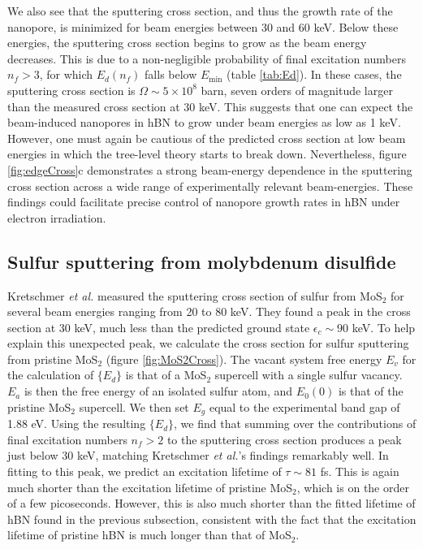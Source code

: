 \documentclass{article}
\begin{document}
We also see that the sputtering cross section, and thus the growth rate of the
nanopore, is minimized for beam energies between 30 and 60 keV.
Below these energies, the sputtering cross section begins to grow as the beam
energy decreases.
This is due to a non-negligible probability of final excitation numbers $n_f >
3$, for which $E_d(n_f)$ falls below $E_\text{min}$ (table \ref{tab:Ed}).
In these cases, the sputtering cross section is $\Omega \sim 5\times10^8$ barn,
seven orders of magnitude larger than the measured cross section at 30 keV.
This suggests that one can expect the beam-induced nanopores in hBN to grow under
beam energies as low as 1 keV.
However, one must again be cautious of the predicted cross section at low beam
energies in which the tree-level theory starts to break down.
Nevertheless, figure \ref{fig:edgeCross}c demonstrates a strong beam-energy
dependence in the sputtering cross section across a wide range of
experimentally relevant beam-energies.
These findings could facilitate precise control of nanopore growth rates in hBN
under electron irradiation.

\subsection{Sulfur sputtering from molybdenum disulfide}
\label{sec:MoS2}

Kretschmer \textit{et al.} measured the sputtering cross section of sulfur from MoS$_2$
for several beam energies ranging from 20 to 80 keV.\cite{Kretschmer2020}
They found a peak in the cross section at 30 keV, much less than the predicted
ground state $\epsilon_c\sim 90$ keV.\cite{Kretschmer2020}
To help explain this unexpected peak, we calculate the cross section for sulfur
sputtering from pristine MoS$_2$ (figure \ref{fig:MoS2Cross}).
The vacant system free energy $E_v$ for the calculation of $\{E_d\}$ is that of a
MoS$_2$ supercell with a single sulfur vacancy.
$E_a$ is then the free energy of an isolated sulfur atom, and $E_0(0)$ is that
of the pristine MoS$_2$ supercell.
We then set $E_g$ equal to the experimental band gap of 1.88 eV.
\cite{Gusakova2017}
Using the resulting $\{E_d\}$, we find that summing over the contributions
of final excitation numbers $n_f > 2$ to the sputtering cross section produces
a peak just below 30 keV, matching Kretschmer \textit{et al.}'s findings remarkably
well.
In fitting to this peak, we predict an excitation lifetime of $\tau \sim 81$
fs.
This is again much shorter than the excitation lifetime of pristine MoS$_2$,
which is on the order of a few picoseconds.\cite{Korn2011, Lagarde2014,
Palummo2015a}
However, this is also much shorter than the fitted lifetime of hBN found in the
previous subsection, consistent with the fact that the excitation lifetime of
pristine hBN is much longer than that of MoS$_2$.
\end{document}
